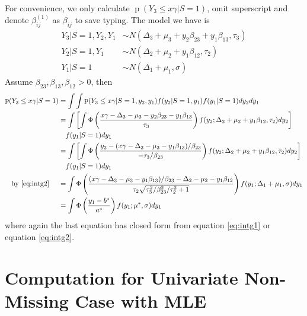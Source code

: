 \documentclass[12pt]{article}
\DeclareMathOperator{\pr}{p}
\begin{document}
\begin{enumerate}
  For convenience, we only calculate $\pr (Y_3 \leq x\gamma | S= 1)$, omit
  superscript and denote $\beta_{ij}^{(1)} $ as $\beta_{ij}$ to save
  typing.  The model we have is
  \begin{align*}
    Y_3 | S= 1 , Y_2, Y_1 & \sim N(\Delta_3 + \mu_3 + y_2\beta_{23} + y_1\beta_{13}, \tau_3) \\
    Y_2 | S = 1, Y_{1}  & \sim N(\Delta_2 + \mu_2 + y_1\beta_{12}, \tau_2)                \\
    Y_1 | S= 1 & \sim N(\Delta_1 + \mu_1, \sigma)
  \end{align*}
  Assume $\beta_{23}, \beta_{13}, \beta_{12} > 0 $, then
  \begin{align*}
    \pr (Y_3 \leq x\gamma |S = 1) & = \int \int \pr (Y_3 \leq x\gamma|S = 1, y_2, y_1) f(y_2|S=1, y_1) f(y_1|S=1) dy_2dy_1\\
    & = \int \left[ \int \Phi \left( \frac{x\gamma - \Delta_3 - \mu_3 - y_2\beta_{23}- y_1\beta_{13}}{\tau_3} \right) f(y_2; \Delta_2+\mu_2+y_1\beta_{12}, \tau_2)dy_2 \right]\\
    & \quad f(y_1|S=1) dy_1\\
    & = \int \left[ \int \Phi \left( \frac{y_2 - (x\gamma - \Delta_3 - \mu_3 - y_1\beta_{13})/\beta_{23}}{-\tau_3/\beta_{23}} \right) f(y_2; \Delta_2+\mu_2+y_1\beta_{12}, \tau_2)dy_2 \right] \\
    & \quad f(y_1|S=1) dy_1\\
    \text{by \eqref{eq:intg2} } \quad & = \int \Phi \left( \frac{(x\gamma - \Delta_3 - \mu_3 - y_1\beta_{13})/\beta_{23} - \Delta_2 - \mu_2 - y_1\beta_{12}}{\tau_2 \sqrt{\tau_3^2/\beta_{23}^2/\tau_2^2 + 1}} \right)f(y_1; \Delta_1+ \mu_1, \sigma) dy_1\\
    & = \int \Phi \left( \frac{y_1 - b^{*}}{a^{*}} \right) f(y_1; \mu^{*}, \sigma)
    dy_1
  \end{align*}
  where again the last equation has closed form from equation
  \eqref{eq:intg1} or equation \eqref{eq:intg2}.
\end{enumerate}

\section{Computation for Univariate Non-Missing Case with MLE}
\end{document}
